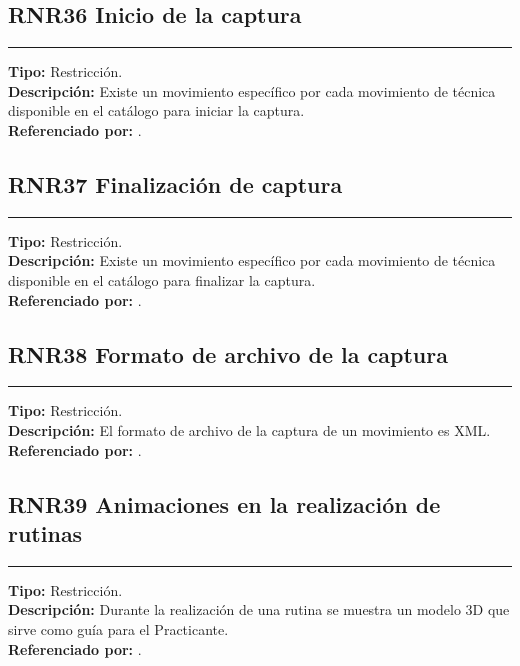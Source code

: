 \subsection{\normalsize{\textcolor[rgb]{0, 0, 0.545098}{RNR36 Inicio de la captura}}}
\label{rn:RNR36}
\rule[3mm]{16.59cm}{0.1mm} \vspace{1mm}
\textbf{Tipo:} Restricción.\\
\textbf{Descripción:} Existe un movimiento específico por cada movimiento de técnica disponible en el catálogo para iniciar la captura.\\
\textbf{Referenciado por: }  .\\

\subsection{\normalsize{\textcolor[rgb]{0, 0, 0.545098}{RNR37 Finalización de captura}}}
\label{rn:RNR37}
\rule[3mm]{16.59cm}{0.1mm} \vspace{1mm}
\textbf{Tipo:} Restricción.\\
\textbf{Descripción:} Existe un movimiento específico por cada movimiento de técnica disponible en el catálogo para finalizar la captura.\\
\textbf{Referenciado por: }  .\\

\subsection{\normalsize{\textcolor[rgb]{0, 0, 0.545098}{RNR38 Formato de archivo de la captura}}}
\label{rn:RNR38}
\rule[3mm]{16.59cm}{0.1mm} \vspace{1mm}
\textbf{Tipo:} Restricción.\\
\textbf{Descripción:} El formato de archivo de la captura de un movimiento es XML.\\
\textbf{Referenciado por: }  .\\

\subsection{\normalsize{\textcolor[rgb]{0, 0, 0.545098}{RNR39 Animaciones en la realización de rutinas}}}
\label{rn:RNR39}
\rule[3mm]{16.59cm}{0.1mm} \vspace{1mm}
\textbf{Tipo:} Restricción.\\
\textbf{Descripción:} Durante la realización de una rutina se muestra un modelo 3D que sirve como guía para el Practicante.\\
\textbf{Referenciado por: }  .\\

